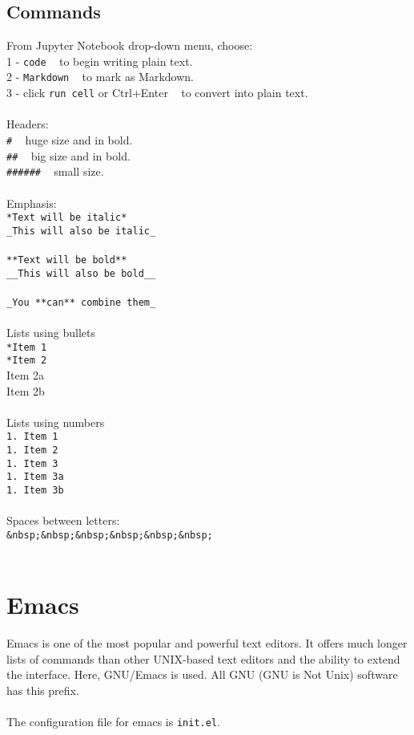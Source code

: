 \documentclass{article}
\begin{document}
{{\subsection{Commands}
From Jupyter Notebook drop-down menu, choose:\\
1 - \texttt{code} ~ to begin writing plain text.\\
2 - \texttt{Markdown} ~ to mark as Markdown.\\
3 - click \texttt{run cell} or Ctrl+Enter ~ to convert into plain text.\\
\\
Headers:\\
\texttt{\#} ~ huge size and in bold.\\
\texttt{\#\#} ~ big size and in bold.\\
\texttt{\#\#\#\#\#\#} ~ small size.\\
\\
Emphasis:\\
\texttt{*Text will be italic*}\\
\texttt{\_This will also be italic\_}\\
\\
\texttt{**Text will be bold**}\\
\texttt{\_\_This will also be bold\_\_}\\
\\
\texttt{\_You **can** combine them\_}\\
\\
Lists using bullets\\
\texttt{*Item 1}\\
\texttt{*Item 2}\\
\indent * Item 2a\\
\indent * Item 2b\\
\\
Lists using numbers\\
\texttt{1. Item 1}\\
\texttt{1. Item 2}\\
\texttt{1. Item 3}\\
\indent \texttt{1. Item 3a}\\
\indent \texttt{1. Item 3b}\\
\\
Spaces between letters:\\
\texttt{\&nbsp;\&nbsp;\&nbsp;\&nbsp;\&nbsp;\&nbsp;} \\
\\

\newpage
\section{Emacs}
Emacs is one of the most popular and powerful text editors. It offers much longer lists of commands than other UNIX-based text editors and the ability to extend the interface. Here, GNU/Emacs is used. All GNU (GNU is Not Unix) software has this prefix. \\
\\
The configuration file for emacs is \texttt{init.el}. 

}}
\end{document}
